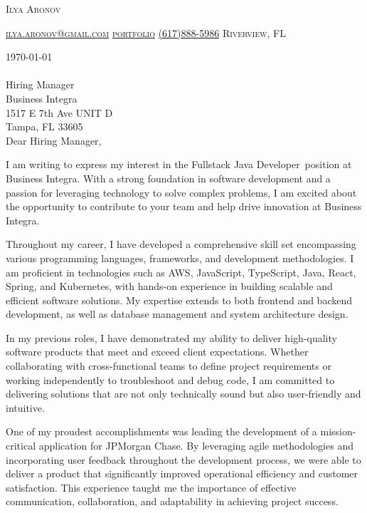 \documentclass[11pt]{letter}
\makeatletter
\def\myemail{ilya.aronov@gmail.com}
\def\myname{Ilya Aronov}
\def\portfolio{https://imaronov.github.io/}
\def\myphone{(617)888-5986}
\def\mylocation{Riverview, FL}
\def\possitionApplied{Fullstack Java Developer}
\def\hiringManager{Hiring Manager}
\def\companyName{Business Integra}
\def\companyAddress{1517 E 7th Ave UNIT D}
\def\companyCity{Tampa, FL 33605}
\def\previousCompany{JPMorgan Chase}
\def\companySkills{AWS, JavaScript, TypeScript, Java, React, Spring, and Kubernetes}
\newcommand{\addressHeading}[4]{
    {#1}\\
    {#2}\\
    {#3}\\
    {#4}\\
}
\newcommand{\greeting}{
    \vspace{-0.1in}Dear \hiringManager,
}
\makeatother
\begin{document}
\AddToShipoutPictureBG{%
\color{gr}
\AtPageUpperLeft{\rule[-1.3in]{\paperwidth}{1.3in}}
}

\begin{center}
{\fontsize{28}{0}\selectfont\scshape \myname}

\fontsize{10}{0}\selectfont\scshape \href{mailto:\myemail}{\faEnvelope\enspace \myemail}\hfill
\fontsize{10}{0}\selectfont\scshape \href{\portfolio}{\faUser\enspace portfolio}\hfill
\fontsize{10}{0}\selectfont\scshape \href{tel:\myphone}{\faPhone\enspace \myphone}\hfill
\fontsize{10}{0}\selectfont\scshape \faMapMarker\enspace \mylocation
\end{center}

\vspace{0.2in}

\today
\\ \\
\addressHeading{\hiringManager}{\companyName}{\companyAddress}{\companyCity}

\greeting

I am writing to express my interest in the \possitionApplied\, position at \companyName.
With a strong foundation in software development and a passion for leveraging technology to solve complex problems,
I am excited about the opportunity to contribute to your team and help drive innovation at \companyName.

Throughout my career, I have developed a comprehensive skill set encompassing various programming languages, frameworks, and development methodologies.
I am proficient in technologies such as \companySkills, with hands-on experience in building scalable and efficient software solutions.
My expertise extends to both frontend and backend development, as well as database management and system architecture design.

In my previous roles, I have demonstrated my ability to deliver high-quality software products that meet and exceed client expectations.
Whether collaborating with cross-functional teams to define project requirements or working independently to troubleshoot and debug code,
I am committed to delivering solutions that are not only technically sound but also user-friendly and intuitive.

One of my proudest accomplishments was leading the development of a mission-critical application for \previousCompany.
By leveraging agile methodologies and incorporating user feedback throughout the development process, we were able to deliver a product that significantly improved operational efficiency and customer satisfaction.
This experience taught me the importance of effective communication, collaboration, and adaptability in achieving project success.
\end{document}
